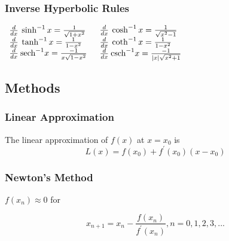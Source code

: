 \documentclass[10pt,letterpaper]{article}
\begin{document}
\begin{multicols}{2}
															\subsubsection*{Inverse Hyperbolic Rules}
															
$ \begin{array}{ll}
   \frac{d}{dx}\: \sinh ^{-1} x = \frac{1}{\sqrt{1 + x ^{2}}} \\
   \frac{d}{dx}\: \tanh ^{-1} x = \frac{1}{1 - x ^{2}} \\
   \frac{d}{dx}\: \text{sech} ^{-1} x = \frac{-1}{x \sqrt{1 - x ^{2}}}
  \end{array} $ \hfill
$ \begin{array}{ll}
   \frac{d}{dx}\: \cosh ^{-1} x = \frac{1}{\sqrt{x ^{2} - 1}} \\
   \frac{d}{dx}\: \coth ^{-1} x = \frac{1}{1 - x ^{2}} \\
   \frac{d}{dx}\: \text{csch} ^{-1} x = \frac{-1}{|x|\sqrt{x ^{2} + 1}}
  \end{array} $

\end{multicols}
															\subsection*{Methods}
\begin{multicols}{2}

															\subsubsection*{Linear Approximation}

The linear approximation of $f(x)$ at $x=x_{0}$ is
\[ L(x) = f(x_{0}) + f^\prime (x_{0})(x-x_{0}) \]

															\subsubsection*{Newton's Method}

$f(x_{n})\approx 0$ for

\[ x_{n+1} = x_{n} - \frac{f(x_{n})}{f^\prime (x_{n})}, n=0,1,2,3,... \]

\end{multicols}
\end{document}
